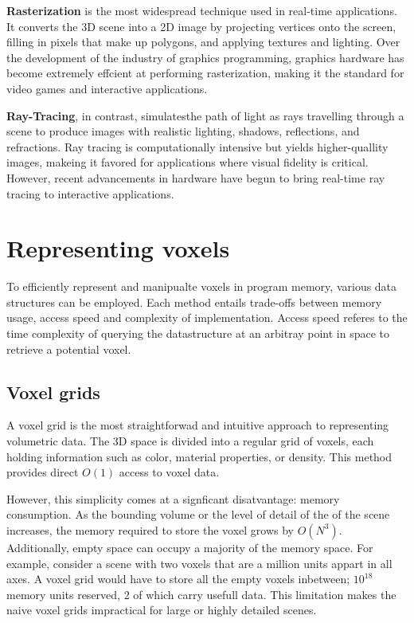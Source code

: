 \textbf{Rasterization} is the most widespread technique  used in real-time applications.
It converts the 3D scene into a 2D image by projecting vertices onto the screen, filling in pixels that make up polygons, and applying textures and lighting.
Over the development of the industry of graphics programming, graphics hardware has become extremely effcient at performing rasterization, making it the standard for video games and interactive applications.

\textbf{Ray-Tracing}, in contrast, simulatesthe path of light as rays travelling through a scene to produce images with realistic lighting, shadows, reflections, and refractions. Ray tracing is computationally intensive but yields higher-quallity images, makeing it favored for applications where visual fidelity is critical. However, recent advancements in hardware have begun to bring real-time ray tracing to interactive applications.

\section{Representing voxels}
To efficiently represent and manipualte voxels in program memory, various data structures can be employed. Each method entails trade-offs between memory usage, access speed and complexity of implementation. Access speed referes to the time complexity of querying the datastructure at an arbitray point in space to retrieve a potential voxel.

\subsection{Voxel grids}
A voxel grid is the most straightforwad and intuitive approach to representing volumetric data. The 3D space is divided into a regular grid of voxels, each holding information such as color, material properties, or density. This method provides direct $O(1)$ access to voxel data.

However, this simplicity comes at a signficant disatvantage: memory consumption.
As the bounding volume or the level of detail of the of the scene increases, the memory required to store the voxel grows by $O(N^{3})$.
Additionally, empty space can occupy a majority of the memory space.
For example, consider a scene with two voxels that are a million units appart in all axes.
A voxel grid would have to store all the empty voxels inbetween; $10^{18}$ memory units reserved, 2 of which carry usefull data.
This limitation makes the naive voxel grids impractical for large or highly detailed scenes.

